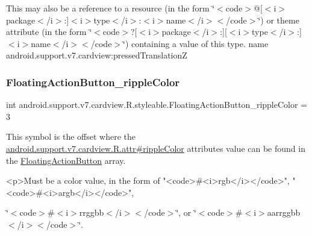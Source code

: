 This may also be a reference to a resource (in the form \char`\"{}$<$code$>$@\mbox{[}$<$i$>$package$<$/i$>$\+:\mbox{]}$<$i$>$type$<$/i$>$\+:$<$i$>$name$<$/i$>$$<$/code$>$\char`\"{}) or theme attribute (in the form \char`\"{}$<$code$>$?\mbox{[}$<$i$>$package$<$/i$>$\+:\mbox{]}\mbox{[}$<$i$>$type$<$/i$>$\+:\mbox{]}$<$i$>$name$<$/i$>$$<$/code$>$\char`\"{}) containing a value of this type.  name android.\+support.\+v7.\+cardview\+:pressed\+TranslationZ \mbox{\label{classandroid_1_1support_1_1v7_1_1cardview_1_1R_1_1styleable_aba4e7e7c1ea8caf0dd310ef0ad576337}} 
\subsubsection{\texorpdfstring{Floating\+Action\+Button\+\_\+ripple\+Color}{FloatingActionButton\_rippleColor}}
{\footnotesize\ttfamily int android.\+support.\+v7.\+cardview.\+R.\+styleable.\+Floating\+Action\+Button\+\_\+ripple\+Color = 3\hspace{0.3cm}{\ttfamily [static]}}

This symbol is the offset where the \hyperlink{classandroid_1_1support_1_1v7_1_1cardview_1_1R_1_1attr_ae44c13dbe37d775ac8c669226c28d6cf}{android.\+support.\+v7.\+cardview.\+R.\+attr\#ripple\+Color} attribute\textquotesingle{}s value can be found in the \hyperlink{classandroid_1_1support_1_1v7_1_1cardview_1_1R_1_1styleable_a1be8c9bcabd399162362befcccf73f59}{Floating\+Action\+Button} array.

\begin{DoxyVerb}      <p>Must be a color value, in the form of "<code>#<i>rgb</i></code>", "<code>#<i>argb</i></code>",
\end{DoxyVerb}
 \char`\"{}$<$code$>$\#$<$i$>$rrggbb$<$/i$>$$<$/code$>$\char`\"{}, or \char`\"{}$<$code$>$\#$<$i$>$aarrggbb$<$/i$>$$<$/code$>$\char`\"{}. 

